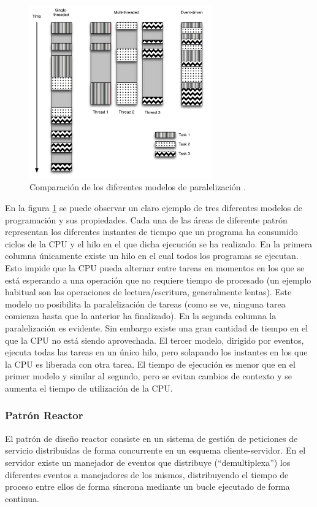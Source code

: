 \begin{figure}[H]
  \centering
  \includegraphics[width=0.7\textwidth]{Chapter2/Figures/threadcomparison}
  \caption[Modelos de paralelización]{Comparación de los diferentes modelos de paralelización \cite{Fettig:2005:TNP:1205685}.}
  \label{fig:threadcomparison}
\end{figure}
En la figura \ref{fig:threadcomparison} se puede observar un claro ejemplo de tres diferentes modelos de programación y sus propiedades. Cada una de las áreas de diferente patrón representan los diferentes instantes de tiempo que un programa ha consumido ciclos de la CPU y el hilo en el que dicha ejecución se ha realizado. En la primera columna únicamente existe un hilo en el cual todos los programas se ejecutan. Esto impide que la CPU pueda alternar entre tareas en momentos en los que se está esperando a una operación que no requiere tiempo de procesado (un ejemplo habitual son las operaciones de lectura/escritura, generalmente lentas). Este modelo no posibilita la paralelización de tareas (como se ve, ninguna tarea comienza hasta que la anterior ha finalizado). En la segunda columna la paralelización es evidente. Sin embargo existe una gran cantidad de tiempo en el que la CPU no está siendo aprovechada. El tercer modelo, dirigido por eventos, ejecuta todas las tareas en un único hilo, pero solapando los instantes en los que la CPU es liberada con otra tarea. El tiempo de ejecución es menor que en el primer modelo y similar al segundo, pero se evitan cambios de contexto y se aumenta el tiempo de utilización de la CPU.

\subsubsection{Patrón Reactor}
\label{teoria:reactor}
El patrón de diseño reactor\cite{Coplien95reactor} consiste en un sistema de gestión de peticiones de servicio distribuidas de forma concurrente en un esquema cliente-servidor. En el servidor existe un manejador de eventos que distribuye (``demultiplexa'') los diferentes eventos a manejadores de los mismos, distribuyendo el tiempo de proceso entre ellos de forma síncrona mediante un bucle ejecutado de forma continua.


